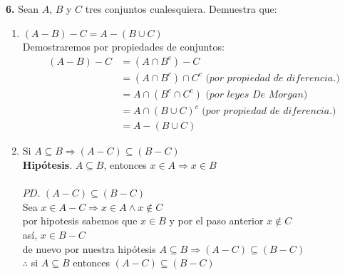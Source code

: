 \documentclass[12pt]{article}
\begin{document}
%
%
\textbf{6.} Sean $A$, $B$ y $C$ tres conjuntos cualesquiera. Demuestra que:
\begin{enumerate}[label=\alph*)]
    \item $(A - B) - C = A - (B \cup C)$\\
    Demostraremos por propiedades de conjuntos:
    \begin{align*}
        (A - B) - C &= (A \cap B^c) - C\\
        &= (A \cap B^c) \cap C^c \textit{ (por propiedad de diferencia.)}\\
        &= A \cap (B^c \cap C^c) \textit{ (por leyes De Morgan)}\\
        &= A \cap (B \cup C)^c \textit{ (por propiedad de diferencia.)}\\
        &= A - (B \cup C)
    \end{align*}

    \item Si $A \subseteq B \Longrightarrow (A - C) \subseteq (B - C)$\\
    \textbf{Hipótesis}. $A \subseteq B$, entonces $x \in A \Longrightarrow x \in B$\\
    \\
    $PD$. $(A - C) \subseteq (B - C)$\\
    Sea $x \in A - C \Longrightarrow x \in A \land x \notin C$\\
    por hipotesis sabemos que $x \in B$ y por el paso anterior $x \notin C$\\
    así, $x \in B - C$\\
    de nuevo por nuestra hipótesis $A \subseteq B \Longrightarrow (A - C) \subseteq (B - C)$\\
    $\therefore$ si $A \subseteq B$ entonces $(A - C) \subseteq (B - C)$

\end{enumerate}
\end{document}
